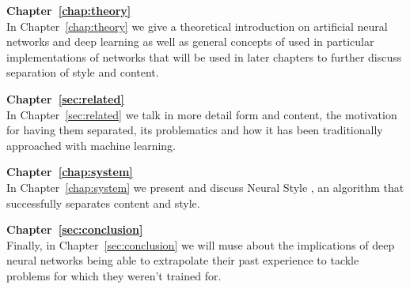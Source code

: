 \textbf{Chapter~\ref{chap:theory}} \\[0.2em]
In Chapter~\ref{chap:theory} we give a theoretical introduction on artificial neural networks and deep learning as well as general concepts of used in particular implementations of networks that will be used in later chapters to further discuss separation of style and content.

\textbf{Chapter~\ref{sec:related}} \\[0.2em]
In Chapter~\ref{sec:related} we talk in more detail form and content, the motivation for having them separated, its problematics and how it has been traditionally approached with machine learning.

\textbf{Chapter~\ref{chap:system}} \\[0.2em]
In Chapter~\ref{chap:system} we present and discuss Neural Style \cite{Gatys2015B}, an algorithm that successfully separates content and style.

\textbf{Chapter~\ref{sec:conclusion}} \\[0.2em]
Finally, in Chapter~\ref{sec:conclusion} we will muse about the implications of deep neural networks being able to extrapolate their past experience to tackle problems for which they weren't trained for.

